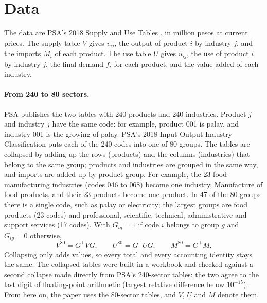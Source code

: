 \documentclass[11pt]{article}
\begin{document}
\section{Data}\label{sec:data}

The data are PSA's 2018 Supply and Use Tables \citep{PSA2021SUT,PSA2021Release}, in million pesos at current prices. The supply table $V$ gives $v_{ij}$, the output of product $i$ by industry $j$, and the imports $M_i$ of each product. The use table $U$ gives $u_{ij}$, the use of product $i$ by industry $j$, the final demand $f_i$ for each product, and the value added of each industry.

\paragraph{From 240 to 80 sectors.} PSA publishes the two tables with 240 products and 240 industries. Product $j$ and industry $j$ have the same code: for example, product 001 is palay, and industry 001 is the growing of palay. PSA's 2018 Input-Output Industry Classification \citep{PSA2021Class} puts each of the 240 codes into one of 80 groups. The tables are collapsed by adding up the rows (products) and the columns (industries) that belong to the same group; products and industries are grouped in the same way, and imports are added up by product group. For example, the 23 food-manufacturing industries (codes 046 to 068) become one industry, Manufacture of food products, and their 23 products become one product. In 47 of the 80 groups there is a single code, such as palay or electricity; the largest groups are food products (23 codes) and professional, scientific, technical, administrative and support services (17 codes). With $G_{ig}=1$ if code $i$ belongs to group $g$ and $G_{ig}=0$ otherwise,
\begin{equation}
V^{80}=G^{\top}VG,\qquad U^{80}=G^{\top}UG,\qquad M^{80}=G^{\top}M .
\end{equation}
Collapsing only adds values, so every total and every accounting identity stays the same. The collapsed tables were built in a workbook and checked against a second collapse made directly from PSA's 240-sector tables: the two agree to the last digit of floating-point arithmetic (largest relative difference below $10^{-15}$). From here on, the paper uses the 80-sector tables, and $V$, $U$ and $M$ denote them.
\end{document}
